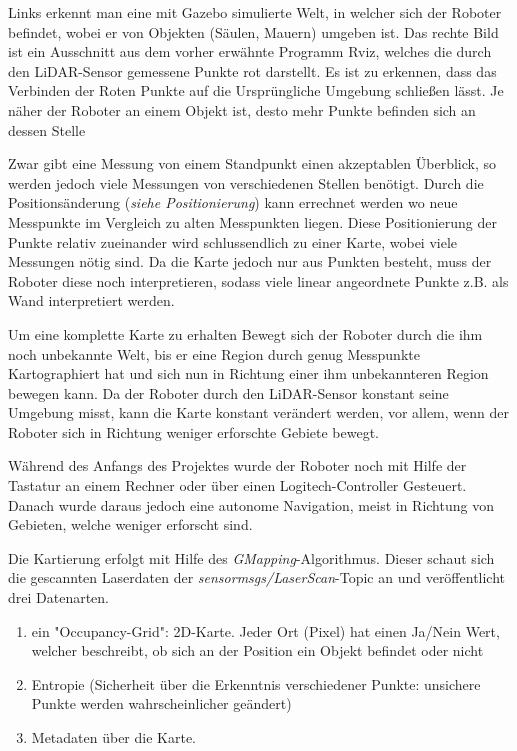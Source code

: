 {{		Links erkennt man eine mit Gazebo simulierte Welt, in welcher sich der Roboter befindet, wobei er von Objekten (Säulen, Mauern) umgeben ist. Das rechte Bild ist ein Ausschnitt aus dem vorher erwähnte Programm Rviz, welches die durch den LiDAR-Sensor gemessene Punkte rot darstellt. Es ist zu erkennen, dass das Verbinden der Roten Punkte auf die Ursprüngliche Umgebung schließen lässt. Je näher der Roboter an einem Objekt ist, desto mehr Punkte befinden sich an dessen Stelle
		
		Zwar gibt eine Messung von einem Standpunkt einen akzeptablen Überblick, so werden jedoch viele Messungen von verschiedenen Stellen benötigt. Durch die Positionsänderung (\textit{siehe Positionierung}) kann errechnet werden wo neue Messpunkte im Vergleich zu alten Messpunkten liegen. Diese Positionierung der Punkte relativ zueinander wird schlussendlich zu einer Karte, wobei viele Messungen nötig sind. Da die Karte jedoch nur aus Punkten besteht, muss der Roboter diese noch interpretieren, sodass viele linear angeordnete Punkte z.B. als Wand interpretiert werden.
		
		Um eine komplette Karte zu erhalten Bewegt sich der Roboter durch die ihm noch unbekannte Welt, bis er eine Region durch genug Messpunkte Kartographiert hat und sich nun in Richtung einer ihm unbekannteren Region bewegen kann. Da der Roboter durch den LiDAR-Sensor konstant seine Umgebung misst, kann die Karte konstant verändert werden, vor allem, wenn der Roboter sich in Richtung weniger erforschte Gebiete bewegt.
		
		Während des Anfangs des Projektes wurde der Roboter noch mit Hilfe der Tastatur an einem Rechner oder über einen Logitech-Controller Gesteuert. Danach wurde daraus jedoch eine autonome Navigation, meist in Richtung von Gebieten, welche weniger erforscht sind. 
		
		Die Kartierung erfolgt mit Hilfe des \textit{GMapping}-Algorithmus. Dieser schaut sich die gescannten Laserdaten der \emph{sensor\textunderscore msgs/LaserScan}-Topic an und veröffentlicht drei Datenarten.
		\begin{enumerate}
			\item ein "Occupancy-Grid": 2D-Karte. Jeder Ort (Pixel) hat einen Ja/Nein Wert, welcher beschreibt, ob sich an der Position ein Objekt befindet oder nicht
			\item Entropie (Sicherheit über die Erkenntnis verschiedener Punkte: unsichere Punkte werden wahrscheinlicher geändert)
			\item Metadaten über die Karte.
		\end{enumerate}
		
}}
